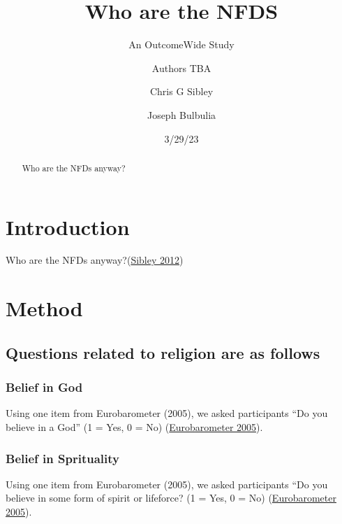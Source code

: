 \documentclass[
  singlecolumn]{report}
\title{Who are the NFDS}
\subtitle{An OutcomeWide Study}
\author{Authors TBA \and Chris G Sibley \and Joseph Bulbulia}
\date{3/29/23}
\begin{document}
\maketitle
\begin{abstract}
Who are the NFDs anyway?
\end{abstract}
\ifdefined\Shaded\renewenvironment{Shaded}{\begin{tcolorbox}[boxrule=0pt, interior hidden, enhanced, borderline west={3pt}{0pt}{shadecolor}, sharp corners, breakable, frame hidden]}{\end{tcolorbox}}\fi

\listoffigures
\listoftables
\hypertarget{introduction}{%
\section{Introduction}\label{introduction}}

Who are the NFDs anyway?(\protect\hyperlink{ref-sibley2012}{Sibley
2012})

\hypertarget{method}{%
\section{Method}\label{method}}

\hypertarget{questions-related-to-religion-are-as-follows}{%
\subsection{Questions related to religion are as
follows}\label{questions-related-to-religion-are-as-follows}}

\hypertarget{belief-in-god}{%
\subsubsection{Belief in God}\label{belief-in-god}}

Using one item from Eurobarometer (2005), we asked participants ``Do you
believe in a God'' (1 = Yes, 0 = No)
(\protect\hyperlink{ref-eurobarometer2005b}{Eurobarometer 2005}).

\hypertarget{belief-in-sprituality}{%
\subsubsection{Belief in Sprituality}\label{belief-in-sprituality}}

Using one item from Eurobarometer (2005), we asked participants ``Do you
believe in some form of spirit or lifeforce? (1 = Yes, 0 = No)
(\protect\hyperlink{ref-eurobarometer2005b}{Eurobarometer 2005}).
\end{document}
